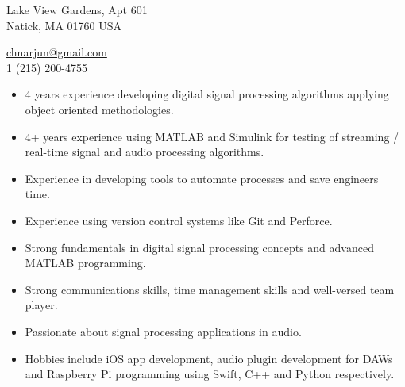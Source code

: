 \documentclass[12pt,a4paper]{article} %
\begin{document}
 


\begin{multicols}{2}

\begin{flushright}
 Lake View Gardens, Apt 601\\ Natick, MA 01760 USA %

\noindent\href{mailto:chnarjun@gmail.com}{chnarjun@gmail.com}\\%
\textsmaller{+}1 (215) 200-4755
\end{flushright}
\end{multicols}
\spacedhrule{0.9em}{-0.4em} %




\begin{itemize}
\item 4 years experience developing digital signal processing algorithms applying object oriented methodologies.
\noindent\item 4+ years experience using MATLAB and Simulink for testing of streaming / real-time signal and audio processing algorithms.
\noindent\item Experience in developing tools to automate processes and save engineers time.
\noindent\item Experience using version control systems like Git and Perforce.
\noindent\item Strong fundamentals in digital signal processing concepts and advanced MATLAB programming.
\noindent\item Strong communications skills, time management skills and well-versed team player.
\noindent\item Passionate about signal processing applications in audio.
\noindent\item Hobbies include iOS app development, audio plugin development for DAWs and Raspberry Pi programming using Swift, C++ and Python respectively.

\end{itemize}
\end{document}
